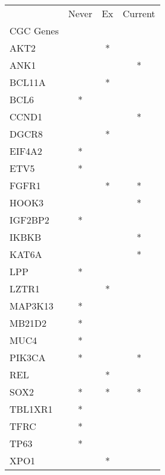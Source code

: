 \begin{tabular}{lccc}
\toprule
{} & Never & Ex & Current \\
CGC Genes &       &    &         \\
\midrule
AKT2      &       &  * &         \\
ANK1      &       &    &       * \\
BCL11A    &       &  * &         \\
BCL6      &     * &    &         \\
CCND1     &       &    &       * \\
DGCR8     &       &  * &         \\
EIF4A2    &     * &    &         \\
ETV5      &     * &    &         \\
FGFR1     &       &  * &       * \\
HOOK3     &       &    &       * \\
IGF2BP2   &     * &    &         \\
IKBKB     &       &    &       * \\
KAT6A     &       &    &       * \\
LPP       &     * &    &         \\
LZTR1     &       &  * &         \\
MAP3K13   &     * &    &         \\
MB21D2    &     * &    &         \\
MUC4      &     * &    &         \\
PIK3CA    &     * &    &       * \\
REL       &       &  * &         \\
SOX2      &     * &  * &       * \\
TBL1XR1   &     * &    &         \\
TFRC      &     * &    &         \\
TP63      &     * &    &         \\
XPO1      &       &  * &         \\
\bottomrule
\end{tabular}
